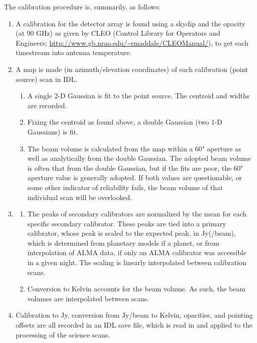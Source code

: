 \documentclass[twocolumn]{aastex62}
\begin{document}
The calibration procedure is, summarily, as follows:
\begin{enumerate}
    \item A calibration for the detector array is found using a skydip and the
        opacity (at 90 GHz) as given by CLEO (Control Library for Operators and
        Engineers; \url{http://www.gb.nrao.edu/~rmaddale/CLEOManual/}), to get
        each timestream into
        antenna temperature.
    \item A map is made (in azimuth/elevation coordinates) of each calibration
        (point source) scan in IDL.
        \begin{enumerate}
            \item A single 2-D Gaussian is fit to the point source. The centroid and widths are recorded.
            \item Fixing the centroid as found above, a double Gaussian (two 1-D Gaussians) is fit.
            \item The beam volume is calculated from the map within a 60"
                aperture as well as analytically from the double Gaussian. The
                adopted beam volume is often that from the double Gaussian, but
                if the fits are poor, the 60" aperture value is generally
                adopted. If both values are questionable, or some other
                indicator of reliability fails, the beam volume of that
                individual scan will be overlooked.
        \end{enumerate}
    \item
        \begin{enumerate}
            \item The peaks of secondary calibrators are normalized by the mean for each specific secondary calibrator. These peaks are tied into a primary calibrator, whose peak is scaled to the expected peak, in Jy(/beam), which is determined from planetary models if a planet, or from interpolation of ALMA data, if only an ALMA calibrator was accessible in a given night. The scaling is linearly interpolated between calibration scans.
            \item Conversion to Kelvin accounts for the beam volume. As such, the beam volumes are interpolated between scans.
        \end{enumerate}
    \item Calibration to Jy, conversion from Jy/beam to Kelvin, opacities, and pointing offsets are all recorded in an IDL save file, which is read in and applied to the processing of the science scans.
\end{enumerate}
\end{document}
